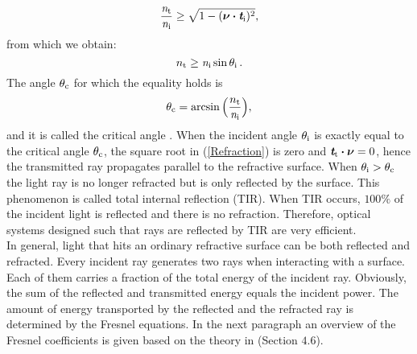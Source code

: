 \begin{equation}
\frac{\textit{n}_\textrm{t}}{\textit{n}_\textrm{i}}\geq \sqrt{1-(\boldsymbol{\nu}\boldsymbol{\cdot}\textit{\textbf{t}}_\textrm{i})^2},
\end{equation}
from which we obtain:
\begin{equation}
 n_\textrm{t}\geq \textit{n}_\textrm{i} \sin\theta_\textrm{i}\,.
\end{equation}
 The angle $\theta_{\textrm{c}}$ for which the equality holds is
\begin{equation}\label{critical}
\theta_{\textrm{c}} = \arcsin\Big(\frac{n_\textrm{t}}{\textit{n}_\textrm{i}}\Big),
\end{equation} and it is called the critical angle \cite{chaves2015introduction}.
When the incident angle $\theta_{\textrm{i}}$ is exactly equal to the critical angle $\theta_{\textrm{c}}$, the square root in (\ref{Refraction}) is zero and $\textit{\textbf{t}}_\textrm{t}\boldsymbol{\cdot}\boldsymbol{\nu}=0$, hence the transmitted ray propagates parallel to the refractive surface. 
When $\theta_{\textrm{i}}>\theta_{\textrm{c}}$ the light ray is no longer refracted but is only reflected by the surface. This phenomenon is called total internal reflection (TIR). When TIR occurs, $100\%$ of the incident light is reflected and there is no refraction. Therefore, optical systems designed such that rays are reflected by TIR are very efficient. \\ \indent 
In general, light that hits an ordinary refractive surface can be both reflected and refracted. Every incident ray generates two rays when interacting with a surface. Each of them carries a fraction of the total energy of the incident ray. Obviously, the sum of the reflected and transmitted energy equals the incident power.
The amount of energy transported by the reflected and the refracted ray is determined by the Fresnel equations. In the next paragraph an overview of the Fresnel coefficients is given based on the theory in \cite{hecht1998hecht} (Section $4.6$).
